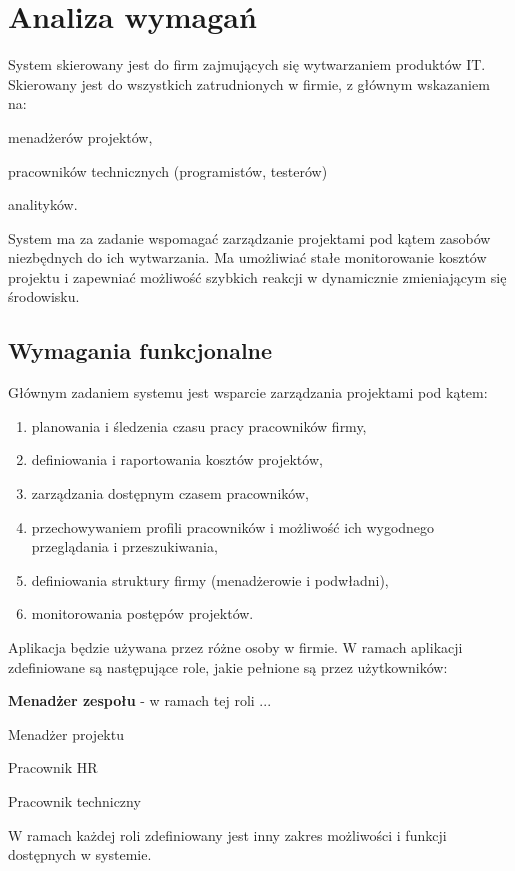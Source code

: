 \section{Analiza wymagań}
System skierowany jest do firm zajmujących się wytwarzaniem produktów IT. Skierowany jest do wszystkich zatrudnionych w firmie, z głównym wskazaniem na:
\begin{itemize*}
\item menadżerów projektów,
\item pracowników technicznych (programistów, testerów)
\item analityków.
\end{itemize*}

System ma za zadanie wspomagać zarządzanie projektami pod kątem zasobów niezbędnych do ich wytwarzania. Ma umożliwiać stałe monitorowanie kosztów projektu i zapewniać możliwość szybkich reakcji w dynamicznie zmieniającym się środowisku.
\subsection{Wymagania funkcjonalne}
Głównym zadaniem systemu jest wsparcie zarządzania projektami pod kątem:
\begin{enumerate}
\item planowania i śledzenia czasu pracy pracowników firmy,
\item definiowania i raportowania kosztów projektów,
\item zarządzania dostępnym czasem pracowników,
\item przechowywaniem profili pracowników i możliwość ich wygodnego przeglądania i przeszukiwania,
\item definiowania struktury firmy (menadżerowie i podwładni),
\item monitorowania postępów projektów.
\end{enumerate}

Aplikacja będzie używana przez różne osoby w firmie. W ramach aplikacji zdefiniowane są następujące role, jakie pełnione są przez użytkowników:
\begin{itemize*}
\item \textbf{Menadżer zespołu} - w ramach tej roli ...
\item Menadżer projektu
\item Pracownik HR
\item Pracownik techniczny
\end{itemize*}
W ramach każdej roli zdefiniowany jest inny zakres możliwości i funkcji dostępnych w systemie.

